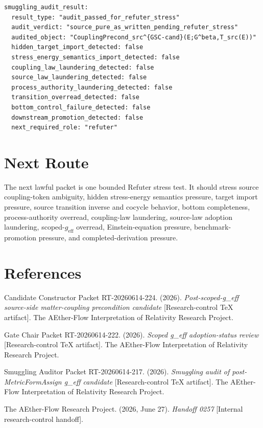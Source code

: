\documentclass[11pt]{article}
\newcommand{\geff}{g_{\mathrm{eff}}}
\begin{document}
\begin{verbatim}
smuggling_audit_result:
  result_type: "audit_passed_for_refuter_stress"
  audit_verdict: "source_pure_as_written_pending_refuter_stress"
  audited_object: "CouplingPrecond_src^{GSC-cand}(E;G^beta,T_src(E))"
  hidden_target_import_detected: false
  stress_energy_semantics_import_detected: false
  coupling_law_laundering_detected: false
  source_law_laundering_detected: false
  process_authority_laundering_detected: false
  transition_overread_detected: false
  bottom_control_failure_detected: false
  downstream_promotion_detected: false
  next_required_role: "refuter"
\end{verbatim}

\section{Next Route}

The next lawful packet is one bounded Refuter stress test. It should stress
source coupling-token ambiguity, hidden stress-energy semantics pressure,
target import pressure, source transition inverse and cocycle behavior,
bottom completeness, process-authority overread, coupling-law laundering,
source-law adoption laundering, scoped-\(\geff\) overread, Einstein-equation
pressure, benchmark-promotion pressure, and completed-derivation pressure.

\section{References}

Candidate Constructor Packet RT-20260614-224. (2026). \textit{Post-scoped-g\_eff
source-side matter-coupling precondition candidate} [Research-control TeX
artifact]. The AEther-Flow Interpretation of Relativity Research Project.

Gate Chair Packet RT-20260614-222. (2026). \textit{Scoped g\_eff adoption-status
review} [Research-control TeX artifact]. The AEther-Flow Interpretation of
Relativity Research Project.

Smuggling Auditor Packet RT-20260614-217. (2026). \textit{Smuggling audit of
post-MetricFormAssign g\_eff candidate} [Research-control TeX artifact]. The
AEther-Flow Interpretation of Relativity Research Project.

The AEther-Flow Research Project. (2026, June 27). \textit{Handoff 0257}
[Internal research-control handoff].
\end{document}
